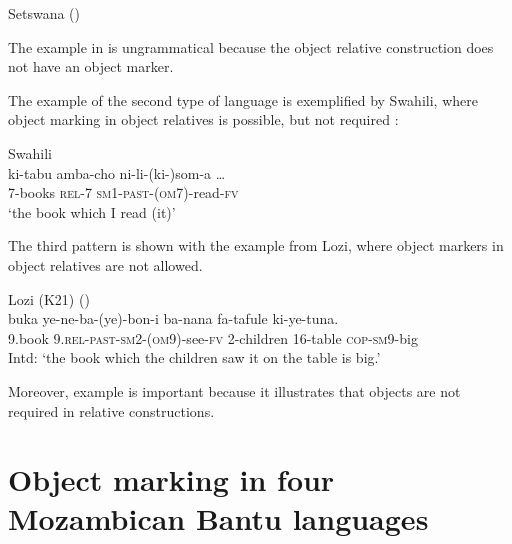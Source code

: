 \documentclass[output=paper]{langscibook}
\begin{document}
\ea\label{ex:ngunga:18}  Setswana  (\citealt[248]{MartenKula2012})\\
    \z
\z

The example in  is ungrammatical because the object relative construction does not have an object marker. 

  The example of the second type of language is exemplified by Swahili, where object marking in object relatives is possible, but not required :

\ea\label{ex:ngunga:19}  Swahili\\
   \gll   ki-tabu    amba-cho  ni-li-(ki-)som-a \ldots\\
      7-books  \textsc{rel}-7    \textsc{sm}1-\textsc{past}-(\textsc{om}7)-read{{}-\textsc{fv}}\\
    \glt  ‘the book which I read (it)’
\z

The third pattern is shown with the example from Lozi, where object markers in object relatives are not allowed. 

\ea\label{ex:ngunga:20}  Lozi (K21)  (\citealt[248]{MartenKula2012})\\
\gll * buka       ye-ne-ba-(ye)-bon-i     ba-nana     fa-tafule  ki-ye-tuna.\\
  {} 9.book   {9.\textsc{rel}-\textsc{past}-\textsc{sm}2-(\textsc{om}9)}{}-see-{\textsc{fv}} 2-children  16-table  {\textsc{cop}-\textsc{sm}9}{}-big\\
\glt \phantom{*} Intd: ‘the book which the children saw it on the table is big.’
\z

Moreover, example  is important because it illustrates that objects are not required in relative constructions.

\section{Object marking in four Mozambican Bantu languages}
\label{sec:ngunga:3}
\end{document}
